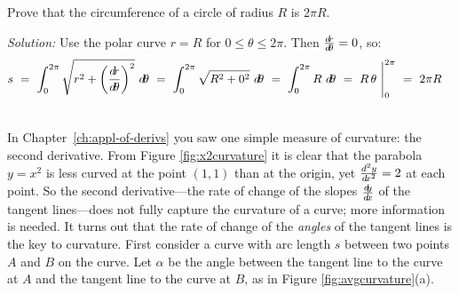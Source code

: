 \newpage
\begin{exmp}
\noindent Prove that the circumference of a circle of radius $R$ is
$2\pi R$.\vspace{1mm}
\par\noindent\emph{Solution:} Use the polar curve $r=R$ for
$0\le\theta\le 2\pi$. Then $\frac{d\!r}{d\!\theta}=0$, so:
\[
s ~=~ \int_0^{2\pi} \sqrt{r^2 + \left(\frac{d\!r}{d\!\theta}\right)^2}~d\!\theta
  ~=~ \int_0^{2\pi} \sqrt{R^2 + 0^2}~d\!\theta ~=~ \int_0^{2\pi} R~d\!\theta
  ~=~ R\,\theta~\Biggr|_0^{2\pi} ~=~ 2\pi R \quad\relax
\]
\end{exmp}
\divider
\vspace{2mm}

\par{}\\
\piccaption[]{\label{fig:x2curvature}}
In Chapter~\ref{ch:appl-of-derivs} you saw one simple measure of curvature: the second derivative.
From Figure \ref{fig:x2curvature} it is clear that the parabola $y=x^2$ is less
curved at the point $(1,1)$ than at the origin, yet $\frac{d^2y}{d\!x^2}=2$ at
each point. So the second derivative---the rate of change of the slopes $\frac{d\negmedspace y}{d\!x}$
of the tangent lines---does not fully capture the curvature of a curve; more
information is needed. It turns out that the rate of change of the \emph{angles}
of the tangent lines is the key to curvature.
First consider a curve with arc length $s$ between two points $A$ and $B$ on the
curve. Let $\alpha$ be the angle between the tangent line to the curve at $A$
and the tangent line to the curve at $B$, as in Figure \ref{fig:avgcurvature}(a).

